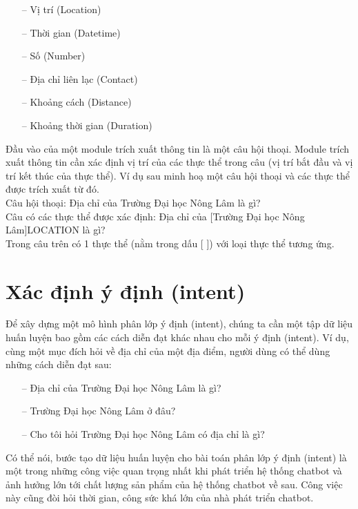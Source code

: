 \begin{enumerate}
          \begin{itemize}
              \item[--] Vị trí (Location)
              \item[--] Thời gian (Datetime)
              \item[--] Số (Number)
              \item[--] Địa chỉ liên lạc (Contact)
              \item[--] Khoảng cách (Distance)
              \item[--] Khoảng thời gian (Duration)
          \end{itemize}
          Đầu vào của một module trích xuất thông tin là một câu hội thoại. Module trích xuất thông tin cần xác định vị trí của các thực thể trong câu (vị trí bắt đầu và vị trí kết thúc của thực thể). Ví dụ sau minh hoạ một câu hội thoại và các thực thể được trích xuất từ đó.
          \\
          Câu hội thoại: Địa chỉ của Trường Đại học Nông Lâm là gì?
          \\
          Câu có các thực thể được xác định: Địa chỉ của [Trường Đại học Nông Lâm]LOCATION là gì?
          \\
          Trong câu trên có 1 thực thể (nằm trong dấu [ ]) với loại thực thể tương ứng.
\end{enumerate}

\section{Xác định ý định (intent)}

Để xây dựng một mô hình phân lớp ý định (intent), chúng ta cần một tập dữ liệu huấn luyện bao gồm các cách diễn đạt khác nhau cho mỗi ý định (intent). Ví dụ, cùng một mục đích hỏi về địa chỉ của một địa điểm, người dùng có thể dùng những cách diễn đạt sau:

\begin{itemize}
    \item[--] Địa chỉ của Trường Đại học Nông Lâm là gì?
    \item[--] Trường Đại học Nông Lâm ở đâu?
    \item[--] Cho tôi hỏi Trường Đại học Nông Lâm có địa chỉ là gì?
\end{itemize}
Có thể nói, bước tạo dữ liệu huấn luyện cho bài toán phân lớp ý định (intent) là một trong những công việc quan trọng nhất khi phát triển hệ thống chatbot và ảnh hưởng lớn tới chất lượng sản phẩm của hệ thống chatbot về sau. Công việc này cũng đòi hỏi thời gian, công sức khá lớn của nhà phát triển chatbot.


